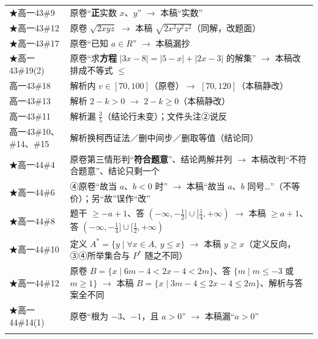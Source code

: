 \documentclass[a4paper,11pt]{article}
\begin{document}
\begin{xltabular}{\textwidth}{@{}>{\raggedright\arraybackslash}p{6.88cm}>{\raggedright\arraybackslash}p{8.28cm}@{}}
★高一43\#9 & 原卷``\textbf{正}实数 \(x\)、\(y\)'' $\to$ 本稿``实数'' \\ \addlinespace[1pt]
★高一43\#12 & 原卷 \(\sqrt{2xyz}\) $\to$ 本稿 \(\sqrt{2x^2y^2z^2}\)（同解，改题面） \\ \addlinespace[1pt]
★高一43\#17 & 原卷``已知 \(a\in R\)'' $\to$ 本稿漏抄 \\ \addlinespace[1pt]
★高一43\#19(2) & 原卷``求\textbf{方程} \(\lvert3x-8\rvert=\allowbreak \lvert5-x\rvert+\allowbreak \lvert2x-3\rvert\) 的解集'' $\to$ 本稿改排成不等式 \(\leqslant\allowbreak \) \\ \addlinespace[1pt]
高一43\#18 & 解析内 \(v\in[70,\allowbreak 100]\)（原卷）$\to$ \([70,\allowbreak 120]\)（本稿静改） \\ \addlinespace[1pt]
高一43\#13 & 解析 \(2-k>0\) $\to$ \(2-k\geqslant\allowbreak 0\)（本稿静改） \\ \addlinespace[1pt]
高一43\#11 & 解析漏 \(\frac35\)（结论行未变）；文件头注②说反 \\ \addlinespace[1pt]
高一43\#10、\#14、\#15 & 解析换柯西证法／删中间步／删取等值（结论同） \\ \addlinespace[1pt]
★高一44\#4 & 原卷第三情形判``\textbf{符合题意}''、结论两解并列 $\to$ 本稿改判``不符合题意''、结论只剩一个 \\ \addlinespace[1pt]
★高一44\#6 & ④原卷``故当 \(a\)、\(b<0\) 时'' $\to$ 本稿``故当 \(a\)、\(b\) 同号\ldots''（不等价）；另``故''误作``改'' \\ \addlinespace[1pt]
★高一44\#8 & 题干 \(\geqslant\allowbreak -a+\allowbreak 1\)、答 \((-\infty,\allowbreak -\frac12]\cup\allowbreak [\frac14,\allowbreak +\allowbreak \infty)\) $\to$ 本稿 \(\geqslant\allowbreak  a+\allowbreak 1\)、答 \((-\infty,\allowbreak -\frac14]\cup\allowbreak [\frac12,\allowbreak +\allowbreak \infty)\) \\ \addlinespace[1pt]
★高一44\#10 & 定义 \(A^*=\allowbreak \{y\mid\allowbreak \forall x\in A,\allowbreak \ y\leqslant\allowbreak  x\}\) $\to$ 本稿 \(y\geqslant\allowbreak  x\)（定义反向，③④所举集合与 \(P^*\) 随之不同） \\ \addlinespace[1pt]
★高一44\#12 & 原卷 \(B=\allowbreak \{x\mid\allowbreak 6m-4<2x-4<2m\}\)、答 \(\{m\mid\allowbreak  m\leqslant\allowbreak -3\) 或 \(m\geqslant\allowbreak 1\}\) $\to$ 本稿 \(B=\allowbreak \{x\mid\allowbreak 3m-4\leqslant\allowbreak 2x-4\leqslant\allowbreak 2m\}\)、解析与答案全不同 \\ \addlinespace[1pt]
★高一44\#14(1) & 原卷``根为 \(-3\)、\(-1\)，且 \(a>0\)'' $\to$ 本稿漏``\(a>0\)'' \\ \addlinespace[1pt]

\end{xltabular}
\end{document}
